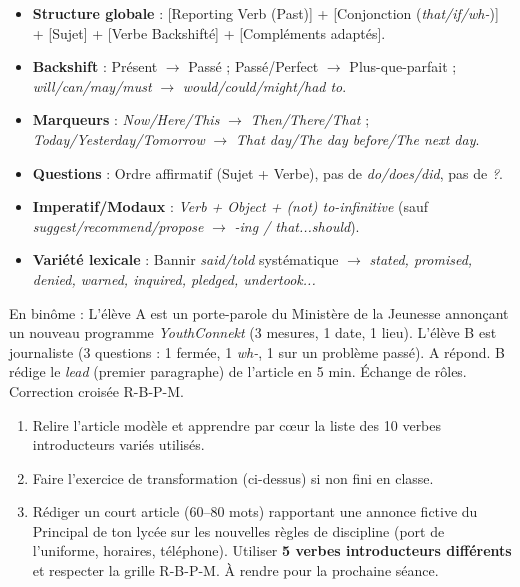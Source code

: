 \documentclass[11pt]{article}
\newcounter{popsec}
\newcounter{popsub}
\newcommand{\courssub}[1]{%
  \stepcounter{popsub}%
  \par\vspace{9pt}\noindent{\popxbold\fontsize{11.5}{13}\selectfont\color{popink}{\color{poporange}\thepopsec.\thepopsub}\hspace{6pt}#1}\par\nopagebreak\vspace{4pt}
}
\begin{document}
\begin{aretenir}
\begin{itemize}
\item \textbf{Structure globale} : [Reporting Verb (Past)] + [Conjonction (\emph{that/if/wh-})] + [Sujet] + [Verbe Backshifté] + [Compléments adaptés].
\item \textbf{Backshift} : Présent $\rightarrow$ Passé ; Passé/Perfect $\rightarrow$ Plus-que-parfait ; \emph{will/can/may/must} $\rightarrow$ \emph{would/could/might/had to}.
\item \textbf{Marqueurs} : \emph{Now/Here/This} $\rightarrow$ \emph{Then/There/That} ; \emph{Today/Yesterday/Tomorrow} $\rightarrow$ \emph{That day/The day before/The next day}.
\item \textbf{Questions} : Ordre affirmatif (Sujet + Verbe), pas de \emph{do/does/did}, pas de \emph{?}.
\item \textbf{Imperatif/Modaux} : \emph{Verb + Object + (not) to-infinitive} (sauf \emph{suggest/recommend/propose} $\rightarrow$ \emph{-ing / that...should}).
\item \textbf{Variété lexicale} : Bannir \emph{said/told} systématique $\rightarrow$ \emph{stated, promised, denied, warned, inquired, pledged, undertook...}
\end{itemize}
\end{aretenir}

\begin{experience}
En binôme : L'élève A est un porte-parole du Ministère de la Jeunesse annonçant un nouveau programme \emph{YouthConnekt} (3 mesures, 1 date, 1 lieu). L'élève B est journaliste (3 questions : 1 fermée, 1 \emph{wh-}, 1 sur un problème passé). A répond. B rédige le \emph{lead} (premier paragraphe) de l'article en 5 min. Échange de rôles. Correction croisée R-B-P-M.
\end{experience}

\courssub{Homework / Devoirs}
\begin{enumerate}
\item Relire l'article modèle et apprendre par cœur la liste des 10 verbes introducteurs variés utilisés.
\item Faire l'exercice de transformation (ci-dessus) si non fini en classe.
\item Rédiger un court article (60--80 mots) rapportant une annonce fictive du Principal de ton lycée sur les nouvelles règles de discipline (port de l'uniforme, horaires, téléphone). Utiliser \textbf{5 verbes introducteurs différents} et respecter la grille R-B-P-M. À rendre pour la prochaine séance.
\end{enumerate}
\end{document}
